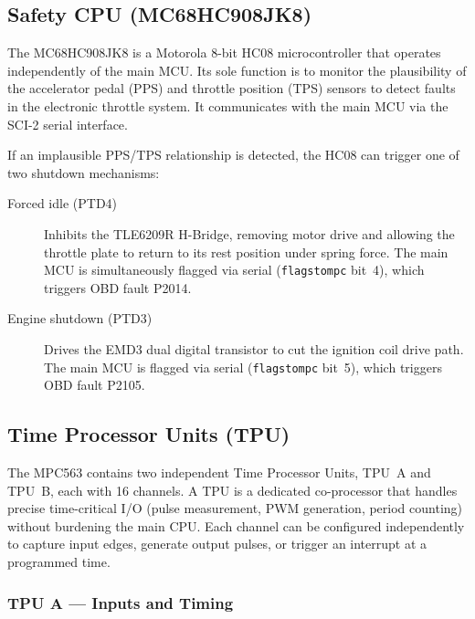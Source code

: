 \documentclass[a4paper,11pt]{article}
\renewcommand{\_}{\oldunderscore\allowbreak}
\begin{document}
\subsection{Safety CPU (MC68HC908JK8)}\label{sec:safety-cpu}

The MC68HC908JK8 is a Motorola 8-bit HC08 microcontroller that operates
independently of the main MCU. Its sole function is to monitor the plausibility
of the accelerator pedal (PPS) and throttle position (TPS) sensors to detect
faults in the electronic throttle system. It communicates with the main MCU via
the SCI-2 serial interface.

If an implausible PPS/TPS relationship is detected, the HC08 can trigger one of
two shutdown mechanisms:

\begin{description}
\item[Forced idle (PTD4)] Inhibits the TLE6209R H-Bridge, removing motor drive
  and allowing the throttle plate to return to its rest position under spring
  force. The main MCU is simultaneously flagged via serial
  (\texttt{flags\_to\_mpc} bit~4), which triggers OBD fault P2014.
\item[Engine shutdown (PTD3)] Drives the EMD3 dual digital transistor to cut
  the ignition coil drive path. The main MCU is flagged via serial
  (\texttt{flags\_to\_mpc} bit~5), which triggers OBD fault P2105.
\end{description}

\subsection{Time Processor Units (TPU)}

The MPC563 contains two independent Time Processor Units, TPU~A and TPU~B, each
with 16 channels. A TPU is a dedicated co-processor that handles precise
time-critical I/O (pulse measurement, PWM generation, period counting) without
burdening the main CPU. Each channel can be configured independently to capture
input edges, generate output pulses, or trigger an interrupt at a programmed
time.

\subsubsection*{TPU A --- Inputs and Timing}
\end{document}
